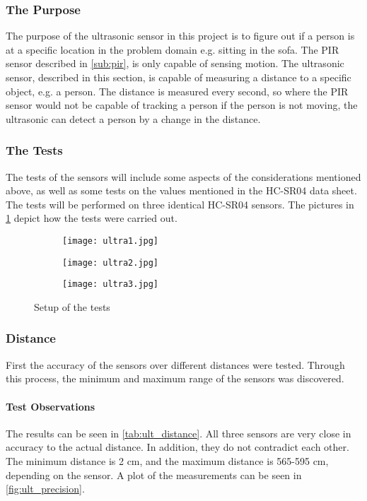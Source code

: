 \subsubsection{The Purpose}
The purpose of the ultrasonic sensor in this project is to figure out if a person is at a specific location in the problem domain e.g. sitting in the sofa. The PIR sensor described in \cref{sub:pir}, is only capable of sensing motion. The ultrasonic sensor, described in this section, is capable of measuring a distance to a specific object, e.g. a person. The distance is measured every second, so where the PIR sensor would not be capable of tracking a person if the person is not moving, the ultrasonic can detect a person by a change in the distance.

\subsubsection{The Tests} The tests of the sensors will include some aspects of the considerations mentioned above, as well as some tests on the values mentioned in the HC-SR04 data sheet\cite{hcsr04}. The tests will be performed on three identical HC-SR04 sensors. The pictures in \cref{fig:ultra} depict how the tests were carried out.

\begin{figure}[htbp]
  \centering
  \begin{subfigure}{.3\textwidth}
    \centering
    \texttt{[image: ultra1.jpg]}
  \end{subfigure}
  \begin{subfigure}{.3\textwidth}
    \centering
    \texttt{[image: ultra2.jpg]}
  \end{subfigure}
  \begin{subfigure}{.3\textwidth}
    \centering
    \texttt{[image: ultra3.jpg]}
  \end{subfigure}
  \caption{Setup of the tests}\label{fig:ultra}
\end{figure}

\subsubsection{Distance}
First the accuracy of the sensors over different distances were tested. Through this process, the minimum and maximum range of the sensors was discovered.

\paragraph{Test Observations}
The results can be seen in \cref{tab:ult_distance}. All three sensors are very close in accuracy to the actual distance. In addition, they do not contradict each other. The minimum distance is 2 cm, and the maximum distance is 565-595 cm, depending on the sensor. A plot of the measurements can be seen in \cref{fig:ult_precision}.

